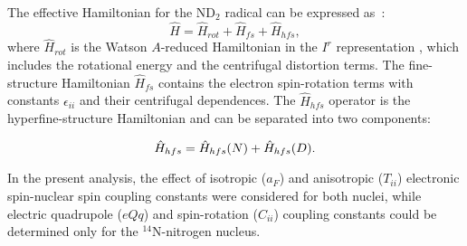 \documentclass[twocolumn]{aastex61}
\begin{document}
The effective Hamiltonian for the ND$_2$ radical can be expressed as~\citep{Kan91,Mor97}:
\begin{equation}
\hat{H}=\hat{H}_{rot}+\hat{H}_{fs}+\hat{H}_{hfs},
\end{equation}
where $\hat{H}_{rot}$ is the Watson $A$-reduced Hamiltonian in the $I^{r}$ representation \citep{Wat77}, 
which includes the rotational energy and the centrifugal distortion terms. 
The fine-structure Hamiltonian $\hat{H}_{fs}$ contains the electron spin-rotation terms with constants 
$\epsilon_{ii}$ and their centrifugal dependences. The $\hat{H}_{hfs}$ operator is the hyperfine-structure 
Hamiltonian and can be separated into two components:

\begin{equation}
\hat{H}_{hfs}=\hat{H}_{hfs}(N)+\hat{H}_{hfs}(D).
\smallskip
\end{equation}

In the present analysis, the effect of isotropic ($a_{F}$) and anisotropic ($T_{ii}$) electronic spin-nuclear spin coupling constants 
were considered for both nuclei, while electric quadrupole ($eQq$) and spin-rotation ($C_{ii}$) coupling constants 
could be determined only for the $^{14}$N-nitrogen nucleus.
\end{document}
